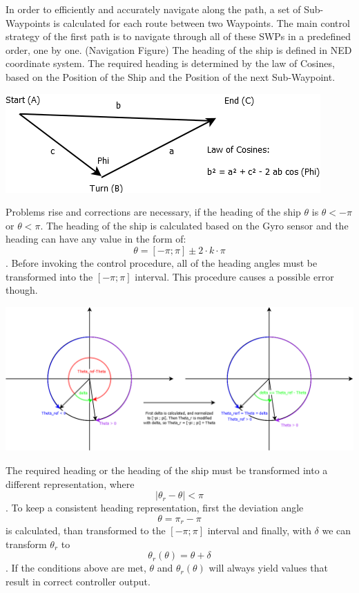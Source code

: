 In order to efficiently and accurately navigate along the path, a set of Sub-Waypoints is calculated for each route between two Waypoints. The main control strategy of the first path is to navigate through all of these SWPs in a predefined order, one by one. (Navigation Figure) The heading of the ship is defined in NED coordinate system. The required heading is determined by the law of Cosines, based on the Position of the Ship and the Position of the next Sub-Waypoint.
\begin{center}
\includegraphics[scale = 0.4]{img/ControlStrategyFigures/Law_of_Cosines.png}
\end{center}
Problems rise and corrections are necessary, if the heading of the ship $\theta$ is $\theta < -\pi$ or $\theta < \pi$. The heading of the ship is calculated based on the Gyro sensor and the heading can have any value in the form of: $$\theta = [-{\pi} ; \pi ] \pm 2 \cdot k \cdot \pi$$. Before invoking the control procedure, all of the heading angles must be transformed into the $[-\pi ; \pi]$ interval.
This procedure causes a possible error though.

\includegraphics[width=\textwidth]{img/ControlStrategyFigures/Headings.png}

The required heading or the heading of the ship must be transformed into a different representation, where $$|\theta_{r}-\theta| < \pi$$. To keep a consistent heading representation, first the deviation angle $$\theta = \pi_{r}-\pi$$ is calculated, than transformed to the $[-\pi;\pi]$ interval and finally, with $\delta$ we can transform $\theta_{r}$ to $$\theta_{r}(\theta) = \theta + \delta$$.
If the conditions above are met, $\theta$ and $\theta_r(\theta)$ will always yield values that result in correct controller output.

